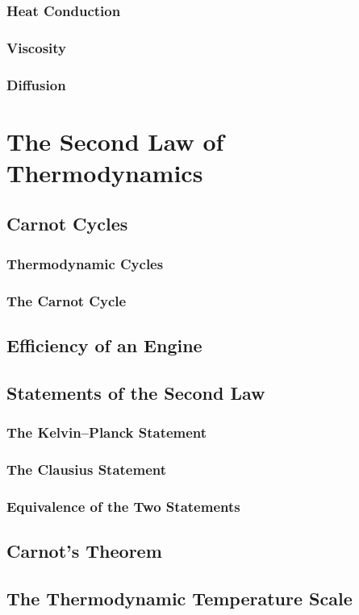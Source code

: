 \documentclass{article}
\begin{document}
\subsubsection{Heat Conduction}
\subsubsection{Viscosity}
\subsubsection{Diffusion}

\section{The Second Law of Thermodynamics}
\subsection{Carnot Cycles}
\subsubsection{Thermodynamic Cycles}
\subsubsection{The Carnot Cycle}
\subsection{Efficiency of an Engine}
\subsection{Statements of the Second Law}
\subsubsection{The Kelvin--Planck Statement}
\subsubsection{The Clausius Statement}
\subsubsection{Equivalence of the Two Statements}
\subsection{Carnot's Theorem}
\subsection{The Thermodynamic Temperature Scale}
\end{document}
